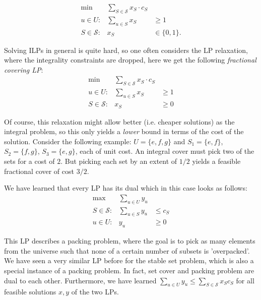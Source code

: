 \documentclass{article}
\begin{document}
\begin{eqnarray}\label{SCILP}
\mbox{min} & \displaystyle \sum_{S\in \mathcal{S}} x_S \cdot c_S\\
 u\in U: & \displaystyle \sum_{u\in S} x_S  & \geq 1 \nonumber\\
 S \in \mathcal{S}: & x_S  & \in \{0,1\}. \nonumber
\end{eqnarray}

Solving ILPs in general is quite hard, so one often considers the LP relaxation, where the integrality constraints
are dropped, here we get the following \emph{fractional covering LP}:
\begin{eqnarray}\label{SCLP}
\mbox{min} & \displaystyle \sum_{S\in \mathcal{S}} x_S \cdot c_S\\
 u\in U: & \displaystyle \sum_{u\in S} x_S  & \geq 1 \nonumber\\
 S \in \mathcal{S}: & x_S  & \geq 0\nonumber
\end{eqnarray}

Of course, this relaxation might allow better (i.e. cheaper solutions) as the integral problem, so this only yields a
\emph{lower} bound in terms of the cost of the solution. Consider the following example:
$U=\{e,f,g\}$ and $S_1=\{e,f\}$, $S_2=\{f,g\}$, $S_3=\{e,g\}$, each of unit cost. An integral cover must pick two of
the sets for a cost of $2$. But picking each set by an extent of $1/2$ yields a feasible fractional cover of cost $3/2$.

We have learned that every LP has its dual which in this case looks as follows:
\begin{eqnarray}\label{DSCLP}
\mbox{max} & \displaystyle \sum_{u\in U} y_u \\
 S\in \mathcal{S}: & \displaystyle \sum_{u\in S} y_u  & \leq c_S \nonumber\\
 u\in U: & y_u  & \geq 0\nonumber
\end{eqnarray}

This LP describes a packing problem, where the goal is to pick as many elements from the universe such that
none of a certain number of subsets is 'overpacked'.
We have seen a very similar LP before for the stable set problem, which is also a special instance
of a packing problem. In fact, set cover and packing problem are dual to
each other. Furthermore, we have learned $\sum_{u \in U} y_u \leq \sum_{S \in \mathcal{S}} x_S c_S$ for all
feasible solutions $x, y$ of the two LPs.
\end{document}
